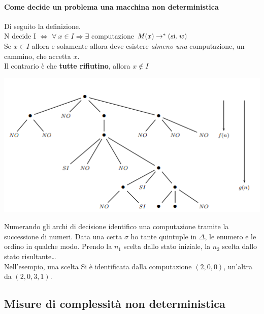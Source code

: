\documentclass[10pt]{book}
\begin{document}
\paragraph{Come decide un problema una macchina non deterministica} Di seguito la definizione.\\
N decide I $\Leftrightarrow$ $\forall\: x \in I \Rightarrow \exists$ computazione $M(x) \rightarrow^* (\textsl{si, }w)$\\
Se $x \in I$ allora e solamente allora deve esistere \textit{almeno una} computazione, un cammino, che accetta $x$.\\
Il contrario è che \textbf{tutte rifiutino}, allora $x \not\in I$\\
\begin{center}
	\includegraphics[scale=1]{grafo_nondet.png}
\end{center}
Numerando gli archi di decisione identifico una computazione tramite la successione di numeri. Data una certa $\sigma$ ho tante quintuple in $\Delta$, le enumero e le ordino in qualche modo. Prendo la $n_1$ scelta dallo stato iniziale, la $n_2$ scelta dallo stato risultante\ldots\\
Nell'esempio, una scelta Si è identificata dalla computazione $(2, 0, 0)$, un'altra da $(2, 0, 3, 1)$.
\subsection{Misure di complessità non deterministica}
\end{document}
